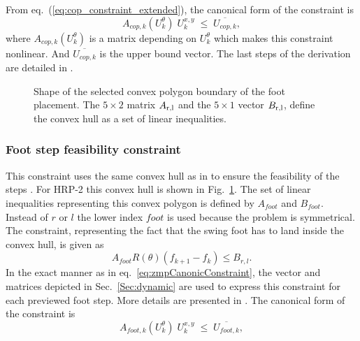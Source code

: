From eq.~(\ref{eq:cop_constraint_extended}), the canonical form of the constraint is
\begin{equation}
A_{cop,k}(U_k^\theta) \; U^{x,y}_{k} \;\leq\; \overline{U_{cop,k}}
,
\label{eq:zmpCanonicConstraint}
\end{equation}
where $A_{cop,k}(U_k^\theta)$ is a matrix depending on $ U_k^\theta $ which makes this constraint nonlinear.
And $\overline{U_{cop,k}}$ is the upper bound vector. %
The last steps of the derivation are detailed in \cite{herdt:iros:2010}.

\begin{figure}[ht]
    \centering
    
    \caption[Foot position constraint]{Shape of the selected convex polygon boundary of the foot placement. The $5\times2$ matrix $A_\textup{r,l}$ and the $5\times1$ vector $B_\textup{r,l}$, define the convex hull as a set of linear inequalities.}
	\label{fig:convexHull}
\end{figure}

\subsubsection{Foot step feasibility constraint}
\label{Sec:constraintOnFootPlacement}

This constraint uses the same convex hull as in \cite{herdt:iros:2010} to ensure the feasibility of the steps \cite{perrin2010approximation}.
For HRP-2 this convex hull is shown in Fig.~\ref{fig:convexHull}.
The set of linear inequalities representing this convex polygon is defined by $A_{foot}$ and $B_{foot}$.
Instead of $r$ or $l$ the lower index $foot$ is used because the problem is symmetrical.
The constraint, representing the fact that the swing foot has to land inside the convex hull, is given as
\begin{equation}
A_{foot} R(\theta) ({f}_{k+1} - {f}_k ) \leq B_{r,l}
.
\end{equation}
In the exact manner as in eq.~\eqref{eq:zmpCanonicConstraint}, the vector and matrices depicted in Sec.~\ref{Sec:dynamic} are used to express this constraint for each previewed foot step.
More details are presented in \cite{herdt:iros:2010}.
The canonical form of the constraint is
\begin{equation}
A_{foot,k}(U^\theta_k) \; U^{x,y}_{k} \;\leq\; \overline{U_{foot,k}}
,
\label{eq:footCanonicConstraint}
\end{equation}


